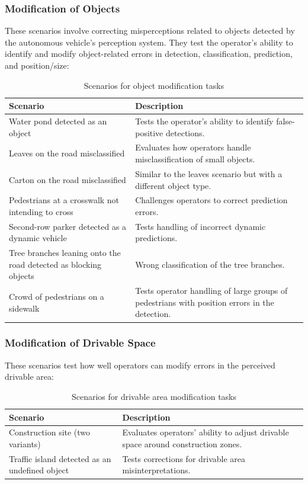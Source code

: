 \subsubsection{Modification of Objects}
These scenarios involve correcting misperceptions related to objects detected by the autonomous vehicle's perception system. They test the operator's ability to identify and modify object-related errors in detection, classification, prediction, and position/size:
\begin{table}[h!]
    \centering
    \begin{tabular}{|p{6cm}|p{7.8cm}|}
    \hline
    \textbf{Scenario} & \textbf{Description} \\
    \hline
    Water pond detected as an object & Tests the operator's ability to identify false-positive detections. \\ \hline
    Leaves on the road misclassified & Evaluates how operators handle misclassification of small objects. \\ \hline
    Carton on the road misclassified & Similar to the leaves scenario but with a different object type. \\ \hline
    Pedestrians at a crosswalk not intending to cross & Challenges operators to correct prediction errors. \\ \hline
    Second-row parker detected as a dynamic vehicle & Tests handling of incorrect dynamic predictions. \\ \hline
    Tree branches leaning onto the road detected as blocking objects & Wrong classification of the tree branches. \\ \hline
    Crowd of pedestrians on a sidewalk & Tests operator handling of large groups of pedestrians with position errors in the detection. \\ \hline
    \end{tabular}
    \caption{Scenarios for object modification tasks}
    \label{table:scenariosobjectmodification}
    \end{table}
\subsubsection{Modification of Drivable Space}
These scenarios test how well operators can modify errors in the perceived drivable area:
\begin{table}[h!]
    \centering
    \begin{tabular}{|p{6cm}|p{7.8cm}|}
    \hline
    \textbf{Scenario} & \textbf{Description} \\
    \hline
    Construction site (two variants) & Evaluates operators' ability to adjust drivable space around construction zones. \\ \hline
    Traffic island detected as an undefined object & Tests corrections for drivable area misinterpretations. \\ \hline
    \end{tabular}
    \caption{Scenarios for drivable area modification tasks}
    \label{table:scenariosdrivablemodification}
    \end{table}

